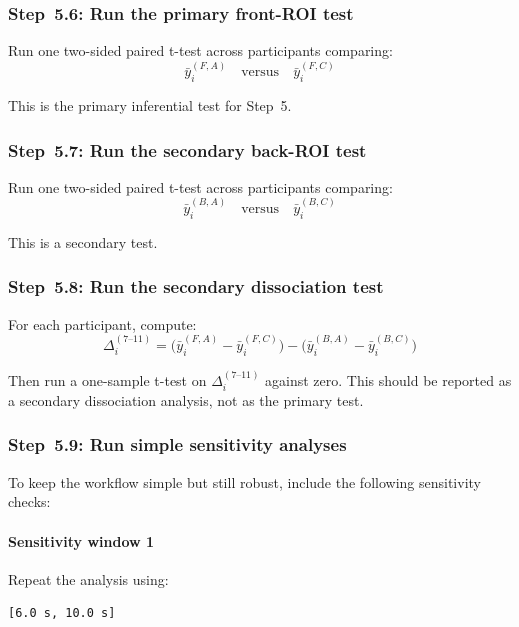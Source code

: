 \documentclass[11pt]{article}
\begin{document}
\subsubsection{Step~5.6: Run the primary front-ROI test}
Run one two-sided paired t-test across participants comparing:
\begin{equation}
\bar{y}^{(F,A)}_i \quad \text{versus} \quad \bar{y}^{(F,C)}_i
\end{equation}

This is the primary inferential test for Step~5.

\subsubsection{Step~5.7: Run the secondary back-ROI test}
Run one two-sided paired t-test across participants comparing:
\begin{equation}
\bar{y}^{(B,A)}_i \quad \text{versus} \quad \bar{y}^{(B,C)}_i
\end{equation}

This is a secondary test.

\subsubsection{Step~5.8: Run the secondary dissociation test}
For each participant, compute:
\begin{equation}
\Delta_i^{(7\text{--}11)}
=
\bigl(\bar{y}^{(F,A)}_i - \bar{y}^{(F,C)}_i\bigr)
-
\bigl(\bar{y}^{(B,A)}_i - \bar{y}^{(B,C)}_i\bigr)
\end{equation}

Then run a one-sample t-test on \(\Delta_i^{(7\text{--}11)}\) against zero.
This should be reported as a secondary dissociation analysis, not as the primary test.

\subsubsection{Step~5.9: Run simple sensitivity analyses}
To keep the workflow simple but still robust, include the following sensitivity checks:

\paragraph{Sensitivity window 1}
Repeat the analysis using:
\begin{verbatim}
[6.0 s, 10.0 s]
\end{verbatim}
\end{document}
